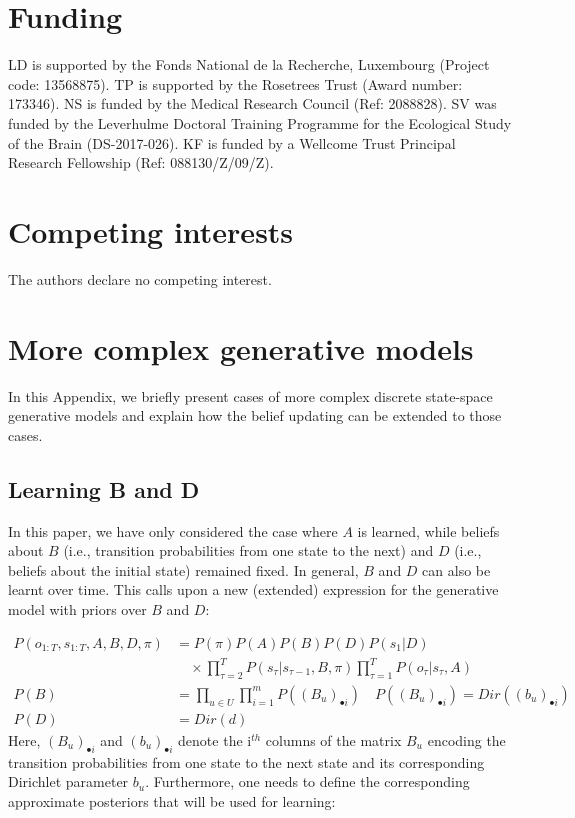 \documentclass[review,12pt,authoryear]{elsarticle}
\begin{document}
\section*{Funding}

LD is supported by the Fonds National de la Recherche, Luxembourg (Project code: 13568875). TP is supported by the Rosetrees Trust (Award number: 173346). NS is funded by the Medical Research Council (Ref: 2088828). SV was funded by the Leverhulme Doctoral Training Programme for the Ecological Study of the Brain (DS-2017-026). KF is funded by a Wellcome Trust Principal Research Fellowship (Ref: 088130/Z/09/Z).

\section*{Competing interests}

The authors declare no competing interest.

\appendix

\section{More complex generative models}
\label{appendix: more complex models}

In this Appendix, we briefly present cases of more complex discrete state-space generative models and explain how the belief updating can be extended to those cases.

\subsection{Learning B and D}
\label{appendix:learning B D}

In this paper, we have only considered the case where $A$ is learned, while beliefs about $B$ (i.e., transition probabilities from one state to the next) and $D$ (i.e., beliefs about the initial state) remained fixed. In general, $B$ and $D$ can also be learnt over time. This calls upon a new (extended) expression for the generative model with priors over $B$ and $D$:

\begin{equation}
    \label{eq: gen mod with B and D}
    \begin{split}
           P(o_{1:T},s_{1:T},A,B,D,\pi) &=P(\pi) P(A)P(B)P(D)P(s_1|D) \\
           &\quad\times \prod_{\tau=2}^T P(s_\tau|s_{\tau-1},B, \pi) \prod_{\tau=1}^T  P(o_\tau|s_\tau,A)  \\
           P(B)&=\prod_{u\in U}\prod_{i=1}^m P((B_u)_{\bullet i})\quad P((B_u)_{\bullet i})=Dir((b_u)_{\bullet i})\\
           P(D)&=Dir(d)
    \end{split}
\end{equation}
Here, $(B_u)_{\bullet i}$ and $(b_u)_{\bullet i}$ denote the i$^{th}$ columns of the matrix $B_u$ encoding the transition probabilities from one state to the next state and its corresponding Dirichlet parameter $b_u$. Furthermore, one needs to define the corresponding approximate posteriors that will be used for learning:
\end{document}
